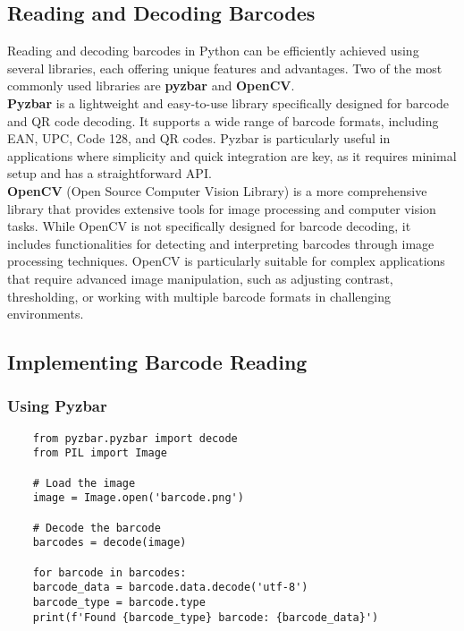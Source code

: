 \subsection{Reading and Decoding Barcodes}

Reading and decoding barcodes in Python can be efficiently achieved using several libraries, each offering unique features and advantages. Two of the most commonly used libraries are \textbf{pyzbar} and \textbf{OpenCV}.\\

\textbf{Pyzbar} is a lightweight and easy-to-use library specifically designed for barcode and QR code decoding. It supports a wide range of barcode formats, including EAN, UPC, Code 128, and QR codes. Pyzbar is particularly useful in applications where simplicity and quick integration are key, as it requires minimal setup and has a straightforward API.\\

\textbf{OpenCV} (Open Source Computer Vision Library) is a more comprehensive library that provides extensive tools for image processing and computer vision tasks. While OpenCV is not specifically designed for barcode decoding, it includes functionalities for detecting and interpreting barcodes through image processing techniques. OpenCV is particularly suitable for complex applications that require advanced image manipulation, such as adjusting contrast, thresholding, or working with multiple barcode formats in challenging environments.\\


\subsection{Implementing Barcode Reading}
\subsubsection{Using Pyzbar}

\begin{lstlisting}
	from pyzbar.pyzbar import decode
	from PIL import Image
	
	# Load the image
	image = Image.open('barcode.png')
	
	# Decode the barcode
	barcodes = decode(image)
	
	for barcode in barcodes:
	barcode_data = barcode.data.decode('utf-8')
	barcode_type = barcode.type
	print(f'Found {barcode_type} barcode: {barcode_data}')
\end{lstlisting}

